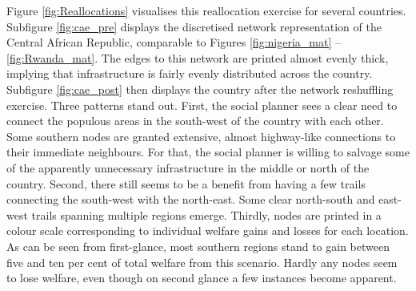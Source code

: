 \documentclass[11pt, oneside]{article}   	%
\begin{document}
Figure \eqref{fig:Reallocations} visualises this reallocation exercise for several countries. Subfigure \eqref{fig:cae_pre} displays the discretised network representation of the Central African Republic, comparable to Figures \eqref{fig:nigeria_mat} -- \eqref{fig:Rwanda_mat}. The edges to this network are printed almost evenly thick, implying that infrastructure is fairly evenly distributed across the country. Subfigure \eqref{fig:cae_post} then displays the country after the network reshuffling exercise. Three patterns stand out. First, the social planner sees a clear need to connect the populous areas in the south-west of the country with each other. Some southern nodes are granted extensive, almost highway-like connections to their immediate neighbours. For that, the social planner is willing to salvage some of the apparently unnecessary infrastructure in the middle or north of the country. Second, there still seems to be a benefit from having a few trails connecting the south-west with the north-east. Some clear north-south and east-west trails spanning multiple regions emerge. Thirdly, nodes are printed in a colour scale corresponding to individual welfare gains and losses for each location. As can be seen from first-glance, most southern regions stand to gain between five and ten per cent of total welfare from this scenario. Hardly any nodes seem to lose welfare, even though on second glance a few instances become apparent.
\end{document}
